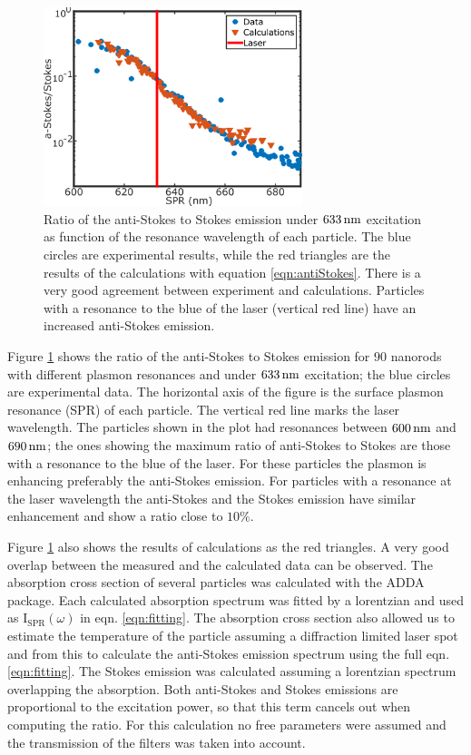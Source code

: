 \begin{figure}[tp] \centering
\includegraphics[width=75.5mm]{Chapters/04_Anti-Stokes/Figures/Supplementary/02_AS_vs_S_SPR/02_AS_vs_S_SPR.png}
\caption{Ratio of the anti-Stokes to Stokes emission under $633\,\textrm{nm}$ excitation
as function of the resonance wavelength of each particle.
The blue circles are experimental results, while the red triangles are the
results of the calculations with equation \ref{eqn:antiStokes}. There is a very
good agreement between experiment and calculations. Particles with a resonance
to the blue of the laser (vertical red line) have an increased anti-Stokes
emission.}
	\label{fig:ASS-ratio}
\end{figure}

Figure \ref{fig:ASS-ratio} shows the ratio of the anti-Stokes to Stokes emission
for $90$ nanorods with different plasmon resonances and under $633\,\textrm{nm}$
excitation; the blue circles are experimental data. The horizontal axis of the
figure is the surface plasmon resonance (SPR) of each particle. The vertical red
line marks the laser wavelength. The particles shown in the plot had resonances
between $600\,\textrm{nm}$ and $690\,\textrm{nm}$; the ones showing the maximum ratio of anti-Stokes
to Stokes are those with a resonance to the blue of the laser. For these
particles the plasmon is enhancing preferably the anti-Stokes emission. For
particles with a resonance at the laser wavelength the anti-Stokes and the
Stokes emission have similar enhancement and show a ratio close to $10\%$. 

Figure \ref{fig:ASS-ratio} also shows the results of calculations as the red
triangles. A very good overlap between the measured and the calculated data can
be observed. The absorption cross section of several particles was calculated
with the ADDA package. Each calculated absorption spectrum was fitted by a
lorentzian and used as $\textrm{I}_{\textrm{SPR}}(\omega)$ in eqn.
\ref{eqn:fitting}. The absorption cross section also allowed us to estimate the
temperature of the particle assuming a diffraction limited laser spot and from
this to calculate the anti-Stokes emission spectrum using the full eqn.
\ref{eqn:fitting}. The Stokes emission was calculated assuming a lorentzian
spectrum overlapping the absorption. Both anti-Stokes and Stokes emissions are
proportional to the excitation power, so that this term cancels out when
computing the ratio. For this calculation no free parameters were assumed and
the transmission of the filters was taken into account.

